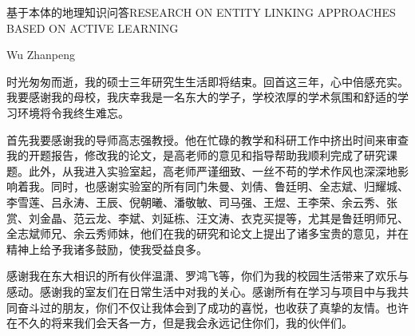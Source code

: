 \documentclass[nomlist,masters,openany]{seuthesix}
\begin{document}
\title{\quad}{基于本体的地理知识问答}{\quad}{RESEARCH ON ENTITY LINKING APPROACHES BASED ON ACTIVE LEARNING}
\author{张赏}{Wu Zhanpeng}
\makebigcover
\makecover


\tableofcontents
\listofothers

\mainmatter











\acknowledgement
时光匆匆而逝，我的硕士三年研究生生活即将结束。回首这三年，心中倍感充实。我要感谢我的母校，我庆幸我是一名东大的学子，学校浓厚的学术氛围和舒适的学习环境将令我终生难忘。

首先我要感谢我的导师高志强教授。他在忙碌的教学和科研工作中挤出时间来审查我的开题报告，修改我的论文，是高老师的意见和指导帮助我顺利完成了研究课题。此外，从我进入实验室起，高老师严谨细致、一丝不苟的学术作风也深深地影响着我。同时，也感谢实验室的所有同门朱曼、刘倩、鲁廷明、全志斌、归耀城、李雪莲、吕永涛、王辰、倪朝曦、潘敬敏、司马强、王煜、王李荣、余云秀、张赏、刘金晶、范云龙、李斌、刘延栋、汪文涛、衣克买提等，尤其是鲁廷明师兄、全志斌师兄、余云秀师妹，他们在我的研究和论文上提出了诸多宝贵的意见，并在精神上给予我诸多鼓励，使我受益良多。

感谢我在东大相识的所有伙伴温潇、罗鸿飞等，你们为我的校园生活带来了欢乐与感动。感谢我的室友们在日常生活中对我的关心。感谢所有在学习与项目中与我共同奋斗过的朋友，你们不仅让我体会到了成功的喜悦，也收获了真挚的友情。也许在不久的将来我们会天各一方，但是我会永远记住你们，我的伙伴们。
\end{document}
